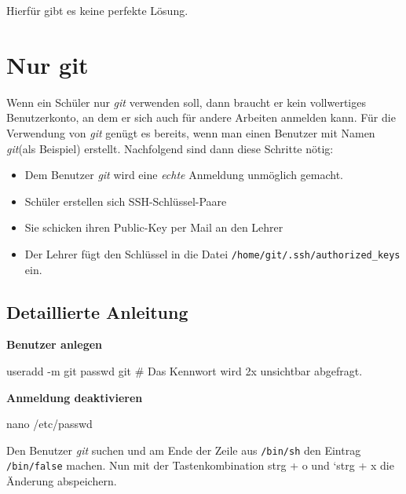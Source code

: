 \documentclass[
  letterpaper,
  DIV=11]{scrreprt}
\newenvironment{Shaded}{\begin{snugshade}}{\end{snugshade}}
\newcommand{\AttributeTok}[1]{\textcolor[rgb]{0.40,0.45,0.13}{#1}}
\newcommand{\CommentTok}[1]{\textcolor[rgb]{0.37,0.37,0.37}{#1}}
\newcommand{\ExtensionTok}[1]{\textcolor[rgb]{0.00,0.23,0.31}{#1}}
\newcommand{\FunctionTok}[1]{\textcolor[rgb]{0.28,0.35,0.67}{#1}}
\newcommand{\NormalTok}[1]{\textcolor[rgb]{0.00,0.23,0.31}{#1}}
\providecommand{\tightlist}{%
  \setlength{\itemsep}{0pt}\setlength{\parskip}{0pt}}\usepackage{longtable,booktabs,array}
\newcommand{\git}{\textit{git}\xspace}
\newcommand{\strg}[1]{strg + #1\xspace}
\begin{document}
Hierfür gibt es keine perfekte Lösung.

\section{Nur git}\label{nur-git}

Wenn ein Schüler nur \git verwenden soll, dann braucht er kein
vollwertiges Benutzerkonto, an dem er sich auch für andere Arbeiten
anmelden kann. Für die Verwendung von \git genügt es bereits, wenn man
einen Benutzer mit Namen \git (als Beispiel) erstellt. Nachfolgend sind
dann diese Schritte nötig:

\begin{itemize}
\tightlist
\item
  Dem Benutzer \git wird eine \emph{echte} Anmeldung unmöglich gemacht.
\item
  Schüler erstellen sich SSH-Schlüssel-Paare
\item
  Sie schicken ihren Public-Key per Mail an den Lehrer
\item
  Der Lehrer fügt den Schlüssel in die Datei
  \texttt{/home/git/.ssh/authorized\_keys} ein.
\end{itemize}

\subsection{Detaillierte Anleitung}\label{detaillierte-anleitung}

\textbf{Benutzer anlegen}

\begin{Shaded}
\begin{Highlighting}[]
\ExtensionTok{useradd} \AttributeTok{{-}m}\NormalTok{ git}
\FunctionTok{passwd}\NormalTok{ git  }\CommentTok{\# Das Kennwort wird 2x unsichtbar abgefragt.}
\end{Highlighting}
\end{Shaded}

\textbf{Anmeldung deaktivieren}

\begin{Shaded}
\begin{Highlighting}[]
\FunctionTok{nano}\NormalTok{ /etc/passwd }
\end{Highlighting}
\end{Shaded}

Den Benutzer \git  suchen und am Ende der Zeile aus \texttt{/bin/sh} den
Eintrag \texttt{/bin/false} machen. Nun mit der Tastenkombination
\strg{o} und `\strg{x} die Änderung abspeichern.
\end{document}
